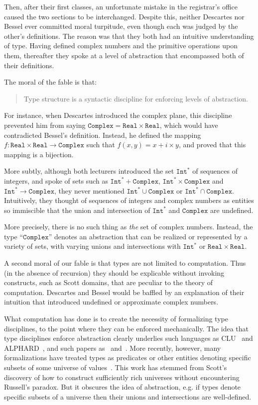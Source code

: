 \documentclass[sigplan,screen,nonacm,balance=false]{acmart}
\makeatletter
\theoremstyle{plain}
\newcommand{\eg}{e.g.\@\xspace}
\newcommand{\Real}{\mathtt{Real}}
\newcommand{\Complex}{\mathtt{Complex}}
\newcommand{\Int}{\mathtt{Int}}
\makeatother
\begin{document}
Then, after their first classes, an unfortunate mistake in the registrar's office caused the two sections to be interchanged.
Despite this, neither Descartes nor Bessel ever committed moral turpitude, even though each was judged by the other's definitions.
The reason was that they both had an intuitive understanding of type.
Having defined complex numbers and the primitive operations upon them, thereafter they spoke at a level of abstraction that encompassed both of their definitions.

The moral of the fable is that:

\begin{quote}
  Type structure is a syntactic discipline for enforcing levels of abstraction.
\end{quote}

For instance, when Descartes introduced the complex plane, this discipline prevented him from saying 
$\Complex = \Real \times \Real$,
which would have contradicted Bessel's definition.
Instead, he defined the mapping
$f : \Real \times \Real \to \Complex$ such that $f(x, y) = x + i \times y$,
and proved that this mapping is a bijection.

More subtly, although both lecturers introduced the set $\Int^*$ of sequences of integers, and spoke of sets such as $\Int^* + \Complex$, $\Int^* \times \Complex$ and $\Int^* \to \Complex$, they never mentioned $\Int^* \cup \Complex$ or $\Int^* \cap \Complex$.
Intuitively, they thought of sequences of integers and complex numbers as entities so immiscible that the union and intersection of $\Int^*$ and $\Complex$ are undefined.

More precisely, there is no such thing as \emph{the} set of complex numbers.
Instead, the type ``$\Complex$'' denotes an abstraction that can be realized or represented by a variety of sets, with varying unions and intersections with $\Int^*$ or $\Real \times \Real$.

A second moral of our fable is that types are not limited to computation.
Thus (in the absence of recursion) they should be explicable without invoking constructs, such as Scott domains, that are peculiar to the theory of computation.
Descartes and Bessel would be baffled by an explanation of their intuition that introduced undefined or approximate complex numbers.

What computation has done is to create the necessity of formalizing type disciplines, to the point where they can be enforced mechanically.
The idea that type disciplines enforce abstraction clearly underlies such languages as CLU~\citep{CLU} and ALPHARD~\citep{Alphard}, and such papers as~\citep{not-sets} and~\citep{polymorphism}.
More recently, however, many formalizations have treated types as predicates or other entities denoting specific subsets of some universe of values~\citep{polytype,retract,applicative,repindep,polydata}.
This work has stemmed from Scott's discovery of how to construct sufficiently rich universes without encountering Russell's paradox.
But it obscures the idea of abstraction, \eg if types denote specific subsets of a universe then their unions and intersections are well-defined.
\end{document}
